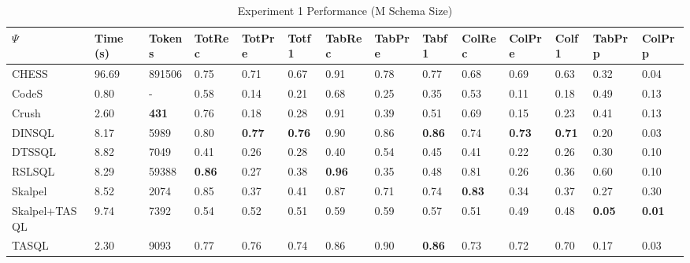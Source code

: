 \begin{table*}
\caption{Experiment 1 Performance (M Schema Size)}
\label{tab:exp1-m-schema}
\begin{tabular}{llllllllllllll}
\toprule
$\Psi$ & Time (s) & Tokens & TotRec & TotPre & Totf1 & TabRec & TabPre & Tabf1 & ColRec & ColPre & Colf1 & TabPrp & ColPrp \\
\midrule
CHESS & 96.69 & 891506 & 0.75 & 0.71 & 0.67 & 0.91 & 0.78 & 0.77 & 0.68 & 0.69 & 0.63 & 0.32 & 0.04 \\
CodeS & 0.80 & - & 0.58 & 0.14 & 0.21 & 0.68 & 0.25 & 0.35 & 0.53 & 0.11 & 0.18 & 0.49 & 0.13 \\
Crush & 2.60 & \textbf{431} & 0.76 & 0.18 & 0.28 & 0.91 & 0.39 & 0.51 & 0.69 & 0.15 & 0.23 & 0.41 & 0.13 \\
DINSQL & 8.17 & 5989 & 0.80 & \textbf{0.77} & \textbf{0.76} & 0.90 & 0.86 & \textbf{0.86} & 0.74 & \textbf{0.73} & \textbf{0.71} & 0.20 & 0.03 \\
DTSSQL & 8.82 & 7049 & 0.41 & 0.26 & 0.28 & 0.40 & 0.54 & 0.45 & 0.41 & 0.22 & 0.26 & 0.30 & 0.10 \\
RSLSQL & 8.29 & 59388 & \textbf{0.86} & 0.27 & 0.38 & \textbf{0.96} & 0.35 & 0.48 & 0.81 & 0.26 & 0.36 & 0.60 & 0.10 \\
Skalpel & 8.52 & 2074 & 0.85 & 0.37 & 0.41 & 0.87 & 0.71 & 0.74 & \textbf{0.83} & 0.34 & 0.37 & 0.27 & 0.30 \\
Skalpel+TASQL & 9.74 & 7392 & 0.54 & 0.52 & 0.51 & 0.59 & 0.59 & 0.57 & 0.51 & 0.49 & 0.48 & \textbf{0.05} & \textbf{0.01} \\
TASQL & 2.30 & 9093 & 0.77 & 0.76 & 0.74 & 0.86 & 0.90 & \textbf{0.86} & 0.73 & 0.72 & 0.70 & 0.17 & 0.03 \\
\bottomrule
\end{tabular}
\end{table*}

